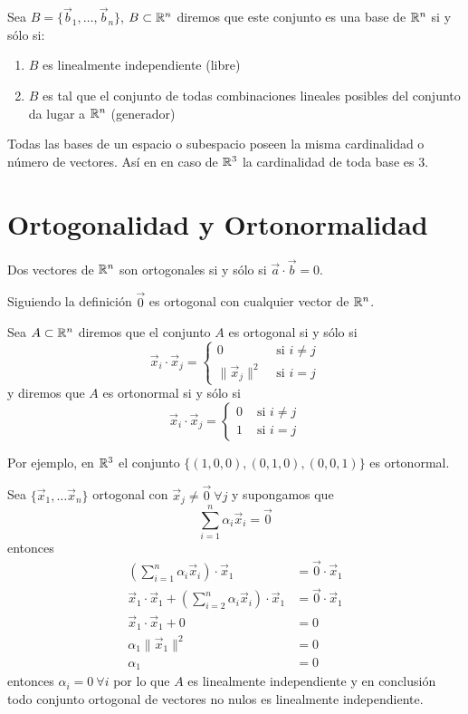 \begin{definicion}
Sea $B=\{\vec{b}_1,\ldots,\vec{b}_n\}$, $B\subset \mathbb{R}^n$ diremos que este conjunto es una base de $\mathbb{R}^n$ si y s\'olo si:
\begin{enumerate}
\item $B$ es linealmente independiente (libre)
\item $B$ es tal que el conjunto de todas combinaciones lineales posibles del conjunto da lugar a $\mathbb{R}^n$ (generador)
\end{enumerate}
\end{definicion}

Todas las bases de un espacio o subespacio poseen la misma cardinalidad o n\'umero de vectores. As\'i en en caso de $\mathbb{R}^3$ la cardinalidad de toda base es 3.

\section{Ortogonalidad y Ortonormalidad}

\begin{definicion}
Dos vectores de $\mathbb{R}^n$ son ortogonales si y s\'olo si $\vec{a}\cdot \vec{b}= 0$. 
\end{definicion}

Siguiendo la definici\'on $\vec{0}$ es ortogonal con cualquier vector de $\mathbb{R}^n$.

\begin{definicion}
Sea $A\subset \mathbb{R}^n$ diremos que el conjunto $A$ es ortogonal si y s\'olo si
$$\vec{x}_i\cdot \vec{x}_j =
\begin{cases}
0 &\text{ si } i\neq j \\
\|\vec{x}_j\|^2 &\text{ si } i=j
\end{cases}$$
y diremos que $A$ es ortonormal si y s\'olo si
$$\vec{x}_i\cdot \vec{x}_j =
\begin{cases}
0 &\text{ si } i\neq j \\
1 &\text{ si } i=j
\end{cases}$$
\end{definicion}

Por ejemplo, en $\mathbb{R}^3$ el conjunto $\{(1,0,0),(0,1,0),(0,0,1)\}$ es ortonormal.

Sea $\{\vec{x}_1,\ldots\vec{x}_n\}$ ortogonal con $\vec{x}_j\neq \vec{0}\:\forall j$ y supongamos que
$$\sum_{i=1}^n \alpha_i \vec{x}_i = \vec{0}$$
entonces 
\begin{align*}
\left(\sum_{i=1}^n \alpha_i \vec{x}_i\right)\cdot \vec{x}_1 &= \vec{0}\cdot \vec{x}_1 \\
\vec{x}_1 \cdot \vec{x}_1 + \left(\sum_{i=2}^n \alpha_i \vec{x}_i\right)\cdot \vec{x}_1 &= \vec{0}\cdot \vec{x}_1 \\
\vec{x}_1 \cdot \vec{x}_1 + 0 &= 0 \\
\alpha_1 \|\vec{x}_1\|^2 &= 0 \\
\alpha_1 &= 0
\end{align*}
entonces $\alpha_i = 0 \: \forall i$ por lo que $A$ es linealmente independiente y en conclusi\'on todo conjunto ortogonal de vectores no nulos es linealmente independiente.

